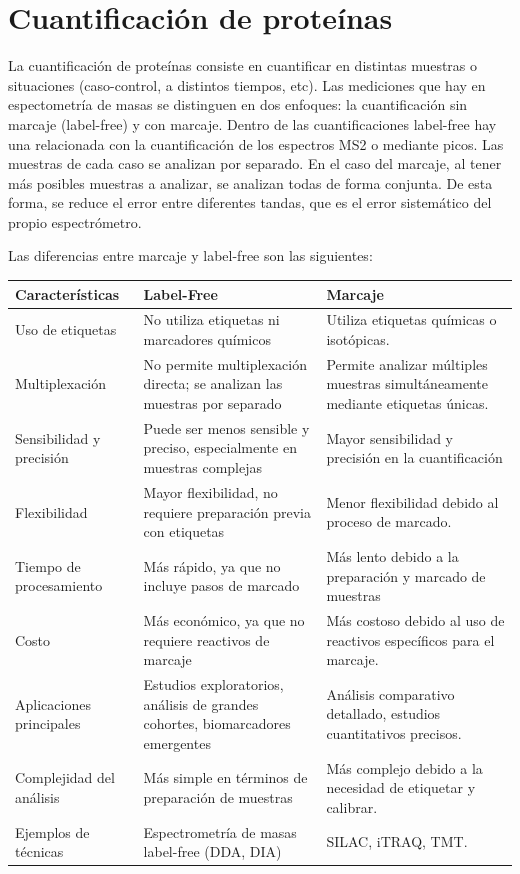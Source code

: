 \chapter{Cuantificación de proteínas}
La cuantificación de proteínas consiste en cuantificar en distintas muestras o situaciones (caso-control, a distintos tiempos, etc). Las mediciones que hay en espectometría de masas se distinguen en dos enfoques: la cuantificación sin marcaje (label-free) y con marcaje. Dentro de las cuantificaciones label-free hay una relacionada con la cuantificación de los espectros MS2 o mediante picos. Las muestras de cada caso se analizan por separado. En el caso del marcaje, al tener más posibles muestras a analizar, se analizan todas de forma conjunta. De esta forma, se reduce el error entre diferentes tandas, que es el error sistemático del propio espectrómetro. 

Las diferencias entre marcaje y label-free son las siguientes:
\begin{table}[h]
\centering
\begin{tabular}{p{2.5cm}|p{6cm}p{6cm}}
Características & Label-Free & Marcaje \\ \hline
Uso de etiquetas & No utiliza etiquetas ni marcadores químicos & Utiliza etiquetas químicas o isotópicas. \\
Multiplexación & No permite multiplexación directa; se analizan las muestras por separado & Permite analizar múltiples muestras simultáneamente mediante etiquetas únicas. \\
Sensibilidad y precisión & Puede ser menos sensible y preciso, especialmente en muestras complejas & Mayor sensibilidad y precisión en la cuantificación \\
Flexibilidad & Mayor flexibilidad, no requiere preparación previa con etiquetas & Menor flexibilidad debido al proceso de marcado. \\
Tiempo de procesamiento & Más rápido, ya que no incluye pasos de marcado & Más lento debido a la preparación y marcado de muestras \\
Costo & Más económico, ya que no requiere reactivos de marcaje & Más costoso debido al uso de reactivos específicos para el marcaje. \\
Aplicaciones principales & Estudios exploratorios, análisis de grandes cohortes, biomarcadores emergentes & Análisis comparativo detallado, estudios cuantitativos precisos. \\
Complejidad del análisis & Más simple en términos de preparación de muestras & Más complejo debido a la necesidad de etiquetar y calibrar. \\
Ejemplos de técnicas & Espectrometría de masas label-free (DDA, DIA) & SILAC, iTRAQ, TMT.
\end{tabular}
\end{table}

